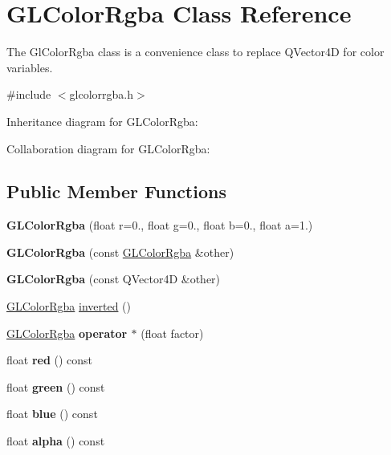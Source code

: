 \hypertarget{class_g_l_color_rgba}{}\section{G\+L\+Color\+Rgba Class Reference}
\label{class_g_l_color_rgba}


The Gl\+Color\+Rgba class is a convenience class to replace Q\+Vector4D for color variables.  




{\ttfamily \#include $<$glcolorrgba.\+h$>$}



Inheritance diagram for G\+L\+Color\+Rgba\+:


Collaboration diagram for G\+L\+Color\+Rgba\+:
\subsection*{Public Member Functions}
\begin{DoxyCompactItemize}
\item 
\mbox{\label{class_g_l_color_rgba_a1dfcf62fbdbb63deac8db456a5d8b05d}} 
{\bfseries G\+L\+Color\+Rgba} (float r=0., float g=0., float b=0., float a=1.)
\item 
\mbox{\label{class_g_l_color_rgba_af3580e510acb408439fa87e5d8653f74}} 
{\bfseries G\+L\+Color\+Rgba} (const \mbox{\hyperlink{class_g_l_color_rgba}{G\+L\+Color\+Rgba}} \&other)
\item 
\mbox{\label{class_g_l_color_rgba_a6ffc715b25827505384d7309235baacf}} 
{\bfseries G\+L\+Color\+Rgba} (const Q\+Vector4D \&other)
\item 
\mbox{\hyperlink{class_g_l_color_rgba}{G\+L\+Color\+Rgba}} \mbox{\hyperlink{class_g_l_color_rgba_aebd1534aa7987e20cf5bf610a30c812c}{inverted}} ()
\item 
\mbox{\label{class_g_l_color_rgba_acc5aee0e35f3165c535416e408170af5}} 
\mbox{\hyperlink{class_g_l_color_rgba}{G\+L\+Color\+Rgba}} {\bfseries operator $\ast$} (float factor)
\item 
\mbox{\label{class_g_l_color_rgba_aae8d243708fe5ebb679ff2b3c1df55b3}} 
float {\bfseries red} () const
\item 
\mbox{\label{class_g_l_color_rgba_a345e39e9aea9ec259b44001e0715d4a7}} 
float {\bfseries green} () const
\item 
\mbox{\label{class_g_l_color_rgba_ab7c2621addaa72a585ad4882a70780d6}} 
float {\bfseries blue} () const
\item 
\mbox{\label{class_g_l_color_rgba_a66d6b14dc626a277e9848fc16230e9c7}} 
float {\bfseries alpha} () const
\end{DoxyCompactItemize}
